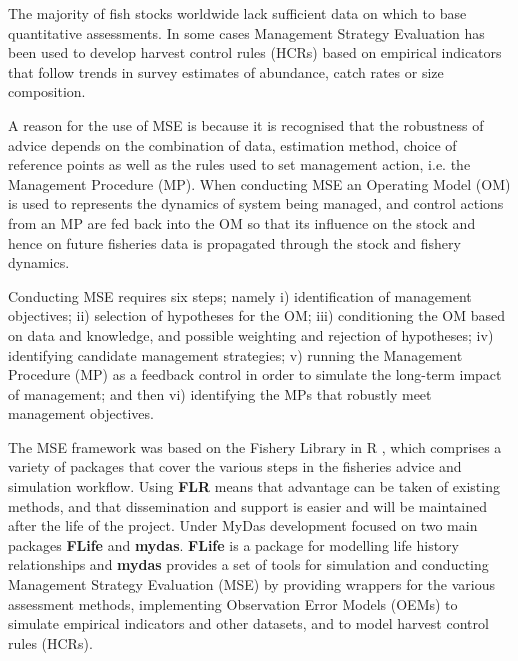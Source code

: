 The majority of fish stocks worldwide lack sufficient data on which to base quantitative assessments. In some cases Management Strategy Evaluation \citep[MSE][]{10.1093/icesjms/fst232} has been used to develop harvest control rules (HCRs) based on empirical indicators that follow trends in survey estimates of abundance, catch rates or size composition. %

A reason for the use of MSE is because it is recognised that the robustness of advice depends on the combination of data, estimation method, choice of reference points as well as the rules used to set management action, i.e. the Management Procedure (MP). When conducting MSE an Operating Model (OM) is used to represents the dynamics of system being managed, and control actions from an MP are fed back into the OM so that its influence on the stock and hence on future fisheries data is propagated through the stock and fishery dynamics. 

Conducting MSE requires six steps; namely i) identification of management objectives; ii) selection of hypotheses for the OM; iii) conditioning the OM based on data and knowledge, and possible weighting and rejection of hypotheses; iv) identifying candidate management strategies; v) running the Management Procedure (MP) as a feedback control in order to simulate the long-term impact of management; and then vi) identifying the MPs that robustly meet management objectives. 

The MSE framework was based on the Fishery Library in R \citep[\href{http://www.flr-project.org/}{FLR}][]{kell2007flr}, which comprises a variety of packages that cover the various steps in the fisheries advice and simulation workflow. Using \textbf{FLR} means that advantage can be taken of existing methods, and that dissemination and support is easier and will be maintained after the life of the project. Under MyDas development focused on two main packages \textbf{FLife} and \textbf{mydas}. \textbf{FLife} is a package for modelling life history relationships and \textbf{mydas} provides a set of tools for simulation and conducting Management Strategy Evaluation (MSE) by providing wrappers for the various assessment methods, implementing Observation Error Models (OEMs) to simulate empirical indicators and other datasets, and to model harvest control rules (HCRs).

